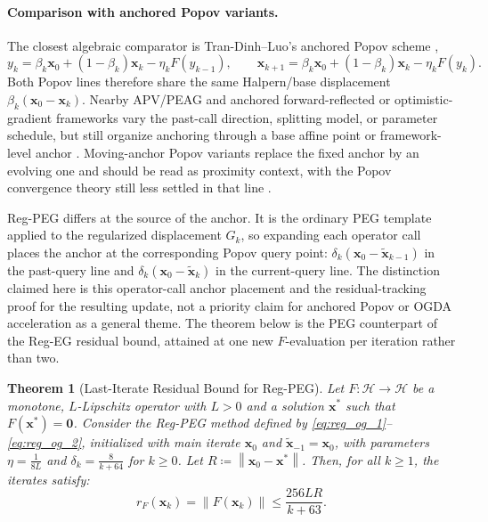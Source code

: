 \documentclass[letterpaper,11pt]{article}
\newcommand{\norm}[1]{\left\| #1 \right\|}
\newcommand{\vect}[1]{\mathbf{#1}}
\newtheorem{theorem}{Theorem}
\begin{document}
\paragraph{Comparison with anchored Popov variants.}
The closest algebraic comparator is Tran-Dinh--Luo's anchored Popov scheme
\cite{tran2021halpern},
\[
    y_k
    =
    \beta_k\vect{x}_0+(1-\beta_k)\vect{x}_k-\eta_kF(y_{k-1}),
    \qquad
    \vect{x}_{k+1}
    =
    \beta_k\vect{x}_0+(1-\beta_k)\vect{x}_k-\eta_kF(y_k).
\]
Both Popov lines therefore share the same Halpern/base displacement
\(\beta_k(\vect{x}_0-\vect{x}_k)\). Nearby APV/PEAG and anchored
forward-reflected or optimistic-gradient frameworks vary the past-call direction,
splitting model, or parameter schedule, but still organize anchoring through a
base affine point or framework-level anchor
\cite{boct2024extra,tran2025accelerated}. Moving-anchor Popov variants replace
the fixed anchor by an evolving one and should be read as proximity context,
with the Popov convergence theory still less settled in that line
\cite{alcala2025stochastic}.

Reg-PEG differs at the source of the anchor. It is the ordinary PEG template
applied to the regularized displacement \(G_k\), so expanding each operator call
places the anchor at the corresponding Popov query point:
\(\delta_k(\vect{x}_0-\tilde{\vect{x}}_{k-1})\) in the past-query line and
\(\delta_k(\vect{x}_0-\tilde{\vect{x}}_k)\) in the current-query line. The
distinction claimed here is this operator-call anchor placement and the
residual-tracking proof for the resulting update, not a priority claim for
anchored Popov or OGDA acceleration as a general theme.
The theorem below is the PEG counterpart of the Reg-EG
residual bound, attained at one new \(F\)-evaluation per iteration rather than
two.

\begin{theorem}[Last-Iterate Residual Bound for Reg-PEG] \label{thm:reg_og}
Let \(F:\mathcal H\to\mathcal H\) be a monotone, \(L\)-Lipschitz operator with \(L>0\) and a solution \(\vect{x}^*\) such that \(F(\vect{x}^*) = \vect{0}\). Consider the Reg-PEG method defined by \eqref{eq:reg_og_1}--\eqref{eq:reg_og_2}, initialized with main iterate \(\vect{x}_0\) and \(\tilde{\vect{x}}_{-1}=\vect{x}_0\), with parameters \(\eta = \frac{1}{8L}\) and \(\delta_k = \frac{8}{k+64}\) for \(k \ge 0\). Let \(R \coloneqq \norm{\vect{x}_0 - \vect{x}^*}\). Then, for all \(k\ge1\), the iterates satisfy:
\[
    r_F(\vect{x}_k)=\norm{F(\vect{x}_k)} \le \frac{256LR}{k+63}.
\]
\end{theorem}
\end{document}
